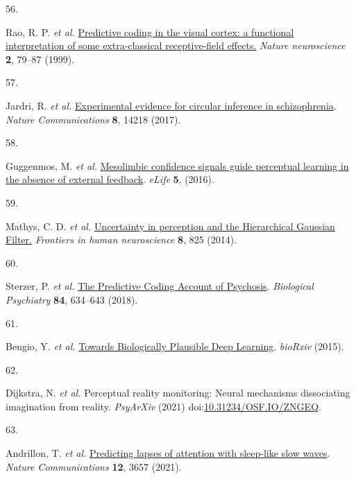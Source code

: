 \documentclass[
]{article}
\newlength{\cslhangindent}
\newlength{\csllabelwidth}
\newlength{\cslentryspacingunit} %
\newenvironment{CSLReferences}[2] %
 {%
  \setlength{\parindent}{0pt}
  \ifodd #1
  \let\oldpar\par
  \def\par{\hangindent=\cslhangindent\oldpar}
  \fi
  \setlength{\parskip}{#2\cslentryspacingunit}
 }%
 {}
\newcommand{\CSLLeftMargin}[1]{\parbox[t]{\csllabelwidth}{#1}}
\newcommand{\CSLRightInline}[1]{\parbox[t]{\linewidth - \csllabelwidth}{#1}\break}
\begin{document}
\begin{CSLReferences}{0}{0}
\leavevmode{}%
\CSLLeftMargin{56. }%
\CSLRightInline{Rao, R. P. \emph{et al.}
\href{https://doi.org/10.1038/4580}{{Predictive coding in the visual
cortex: a functional interpretation of some extra-classical
receptive-field effects.}} \emph{Nature neuroscience} \textbf{2}, 79--87
(1999).}

\leavevmode{}%
\CSLLeftMargin{57. }%
\CSLRightInline{Jardri, R. \emph{et al.}
\href{https://doi.org/10.1038/ncomms14218}{{Experimental evidence for
circular inference in schizophrenia}}. \emph{Nature Communications}
\textbf{8}, 14218 (2017).}

\leavevmode{}%
\CSLLeftMargin{58. }%
\CSLRightInline{Guggenmos, M. \emph{et al.}
\href{https://doi.org/10.7554/eLife.13388}{{Mesolimbic confidence
signals guide perceptual learning in the absence of external feedback}}.
\emph{eLife} \textbf{5}, (2016).}

\leavevmode{}%
\CSLLeftMargin{59. }%
\CSLRightInline{Mathys, C. D. \emph{et al.}
\href{https://doi.org/10.3389/fnhum.2014.00825}{{Uncertainty in
perception and the Hierarchical Gaussian Filter.}} \emph{Frontiers in
human neuroscience} \textbf{8}, 825 (2014).}

\leavevmode{}%
\CSLLeftMargin{60. }%
\CSLRightInline{Sterzer, P. \emph{et al.}
\href{https://doi.org/10.1016/j.biopsych.2018.05.015}{{The Predictive
Coding Account of Psychosis}}. \emph{Biological Psychiatry} \textbf{84},
634--643 (2018).}

\leavevmode{}%
\CSLLeftMargin{61. }%
\CSLRightInline{Bengio, Y. \emph{et al.}
\href{http://arxiv.org/abs/1502.04156}{{Towards Biologically Plausible
Deep Learning}}. \emph{bioRxiv} (2015).}

\leavevmode{}%
\CSLLeftMargin{62. }%
\CSLRightInline{Dijkstra, N. \emph{et al.} {Perceptual reality
monitoring: Neural mechanisms dissociating imagination from reality}.
\emph{PsyArXiv} (2021)
doi:\href{https://doi.org/10.31234/OSF.IO/ZNGEQ}{10.31234/OSF.IO/ZNGEQ}.}

\leavevmode{}%
\CSLLeftMargin{63. }%
\CSLRightInline{Andrillon, T. \emph{et al.}
\href{https://doi.org/10.1038/s41467-021-23890-7}{{Predicting lapses of
attention with sleep-like slow waves}}. \emph{Nature Communications}
\textbf{12}, 3657 (2021).}


\end{CSLReferences}
\end{document}
